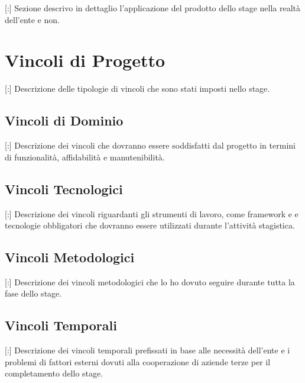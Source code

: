 [:] Sezione descrivo in dettaglio l'applicazione del prodotto dello stage nella realtà dell'ente e non.

\section{Vincoli di Progetto}

[:] Descrizione delle tipologie di vincoli che sono stati imposti nello stage.

\subsection{Vincoli di Dominio}

[:] Descrizione dei vincoli che dovranno essere soddisfatti dal progetto in termini di funzionalità, affidabilità e manutenibilità. 

\subsection{Vincoli Tecnologici}

[:] Descrizione dei vincoli riguardanti gli strumenti di lavoro, come framework e  e tecnologie obbligatori che dovranno essere utilizzati durante l'attività stagistica.

\subsection{Vincoli Metodologici}

[:] Descrizione dei vincoli metodologici che lo ho dovuto seguire durante tutta la fase dello stage.

\subsection{Vincoli Temporali}

[:] Descrizione dei vincoli temporali prefissati in base alle necessità dell'ente e i problemi di fattori esterni dovuti alla cooperazione di aziende terze per il completamento dello stage.
